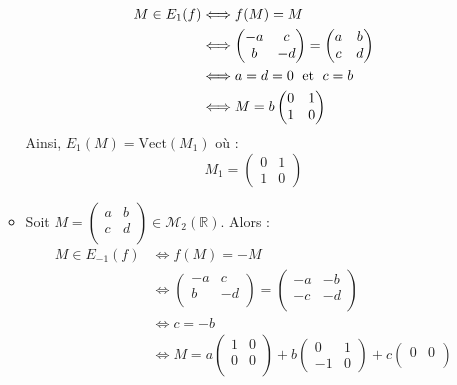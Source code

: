 \documentclass[a4paper,10pt]{report}
\begin{document}
\begin{enumerate}
\begin{itemize}
\begin{align*}
M \in E_1(f) & \Longleftrightarrow f(M)=M \\
& \Longleftrightarrow \begin{pmatrix}
-a&c \\
b & -d \\
\end{pmatrix} = \begin{pmatrix}
a&b \\
c & d \\
\end{pmatrix} \\
& \Longleftrightarrow a=d=0 \; \hbox{ et } \; c=b \\
& \Longleftrightarrow M= b \begin{pmatrix}
0 & 1 \\
1 & 0
\end{pmatrix} 
\end{align*}
Ainsi, $E_1(M) = \textrm{Vect}(M_1)$ où :
$$ M_1 = \begin{pmatrix}
0 & 1 \\
1 & 0
\end{pmatrix}$$
\item Soit $M= \begin{pmatrix}
a&b \\
c & d \\
\end{pmatrix} \in \mathcal{M}_2(\mathbb{R})$. Alors :
\begin{align*}
M \in E_{-1}(f) & \Longleftrightarrow f(M)=-M \\
& \Longleftrightarrow \begin{pmatrix}
-a&c \\
b & -d \\
\end{pmatrix} = \begin{pmatrix}
-a&-b \\
-c & -d \\
\end{pmatrix} \\
& \Longleftrightarrow c=-b\\
& \Longleftrightarrow M=a \begin{pmatrix} 1 & 0 \\
0 & 0 \\ 
\end{pmatrix} + b \begin{pmatrix}
0 & 1 \\
-1 & 0
\end{pmatrix} + c \begin{pmatrix} 0 & 0 \\

\end{pmatrix}
\end{align*}
\end{itemize}
\end{enumerate}
\end{document}
